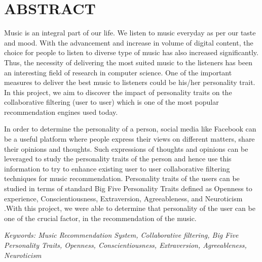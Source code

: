 


\newpage
\section*{ABSTRACT}
Music is an integral part of our life. We listen to music everyday as per our taste and mood. With the advancement and increase in volume of digital content, the choice for people to listen to diverse type of music has also increased significantly. Thus, the necessity of delivering the most suited music to the listeners has been an interesting field of research in computer science. One of the important measures to deliver the best music to listeners could be his/her personality trait. In this project, we aim to discover the impact of personality traits on the collaborative filtering (user to user) which is one of the most popular recommendation engines used today.

In order to determine the personality of a person, social media like Facebook can be a useful platform where people express their views on different matters, share their opinions and thoughts. Such expressions of thoughts and opinions can be leveraged to study the personality traits of the person and hence use this information to try to enhance existing user to user collaborative filtering techniques for music recommendation. Personality traits of the users can be studied in terms of standard Big Five Personality Traits defined as Openness to experience, Conscientiousness, Extraversion, Agreeableness, and Neuroticism \cite{fivefactormodel}.With this project, we were able to determine that personality of the user can be one of the crucial factor, in the recommendation of the music.

{\em Keywords: Music Recommendation System, Collaborative filtering, Big Five Personality Traits, Openness, Conscientiousness, Extraversion, Agreeableness, Neuroticism}
